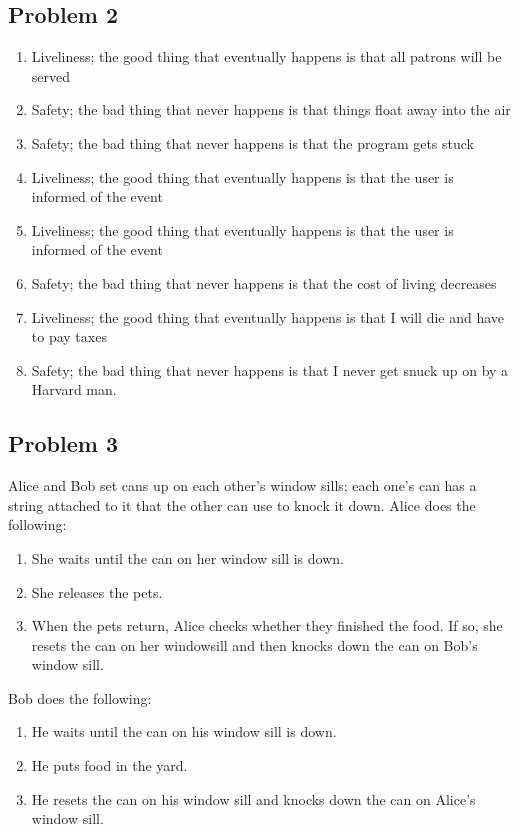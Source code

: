 \documentclass[]{article}
\begin{document}
\subsection{Problem 2}
\begin{enumerate}
	\item Liveliness; the good thing that eventually happens is that all patrons will be served
	\item Safety; the bad thing that never happens is that things float away into the air
	\item Safety; the bad thing that never happens is that the program gets stuck
	\item Liveliness; the good thing that eventually happens is that the user is informed of the event
	\item Liveliness; the good thing that eventually happens is that the user is informed of the event
	\item Safety; the bad thing that never happens is that the cost of living decreases
	\item Liveliness; the good thing that eventually happens is that I will die and have to pay taxes 
	\item Safety; the bad thing that never happens is that I never get snuck up on by a Harvard man.
\end{enumerate}
\subsection{Problem 3}
Alice and Bob set cans up on each other's window sills; each one's can has a string attached to it that the other can use to knock it down.
Alice does the following:
\begin{enumerate}
	\item She waits until the can on her window sill is down.
	\item She releases the pets.
	\item When the pets return, Alice checks whether they finished the food. If so, she resets the can on her windowsill and then knocks down the can on Bob's window sill.
\end{enumerate}
Bob does the following:
\begin{enumerate}
	\item He waits until the can on his window sill is down.
	\item He puts food in the yard.
	\item He resets the can on his window sill and knocks down the can on Alice's window sill.
\end{enumerate}
\end{document}
